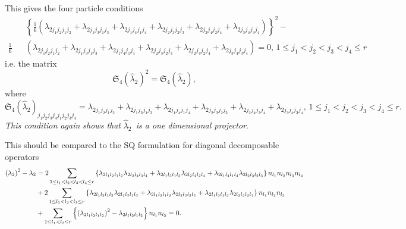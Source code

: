 \documentclass[12pt]{article}
\begin{document}
This gives the four particle conditions%
\begin{eqnarray*}
&&\left\{ \frac{1}{6}\left( \lambda _{2j_{1}j_{2}j_{1}j_{2}}+\lambda
_{2j_{1}j_{3}j_{1}j_{3}}+\lambda _{2j_{1}j_{4}j_{1}j_{4}}+\lambda
_{2j_{2}j_{3}j_{2}j_{3}}+\lambda _{2j_{2}j_{4}j_{2}j_{4}}+\lambda
_{2j_{3}j_{4}j_{3}j_{4}}\right) \right\} ^{2}- \\
\frac{1}{6} &&\left( \lambda _{2j_{1}j_{2}j_{1}j_{2}}+\lambda
_{2j_{1}j_{3}j_{1}j_{3}}+\lambda _{2j_{1}j_{4}j_{1}j_{4}}+\lambda
_{2j_{2}j_{3}j_{2}j_{3}}+\lambda _{2j_{2}j_{4}j_{2}j_{4}}+\lambda
_{2j_{3}j_{4}j_{3}j_{4}}\right) =0,\,1\leq j_{1}<j_{2}<j_{3}<j_{4}\leq r
\end{eqnarray*}%
i.e. the matrix 
\begin{equation*}
\mathfrak{S}_{4}\left( \hat{\lambda}_{2}\right) ^{2}=\mathfrak{S}_{4}\left( 
\hat{\lambda}_{2}\right) ,
\end{equation*}%
where 
\begin{equation*}
\mathfrak{S}_{4}\left( \hat{\lambda}_{2}\right)
_{j_{1}j_{2}j_{3}j_{4}j_{1}j_{2}j_{3}j_{4}}=\lambda
_{2j_{1}j_{2}j_{1}j_{2}}+\lambda _{2j_{1}j_{3}j_{1}j_{3}}+\lambda
_{2j_{1}j_{4}j_{1}j_{4}}+\lambda _{2j_{2}j_{3}j_{2}j_{3}}+\lambda
_{2j_{2}j_{4}j_{2}j_{4}}+\lambda _{2j_{3}j_{4}j_{3}j_{4}},\,1\leq
j_{1}<j_{2}<j_{3}<j_{4}\leq r.
\end{equation*}%
\emph{This condition again shows that }$\hat{\lambda}_{2}$\emph{\ is a one
dimensional projector}.

This should be compared to the SQ formulation for diagonal decomposable
operators 
\begin{align}
\left( \lambda _{2}\right) ^{2}-\lambda _{2}& =2\sum_{\substack{ 1\leq
l_{1}<l_{2}<l_{3}<l_{4}\leq r}}\left\{ \lambda
_{2l_{1}l_{2}l_{1}l_{2}}\lambda _{2l_{3}l_{4}l_{3}l_{4}}+\lambda
_{2l_{1}l_{3}l_{1}l_{3}}\lambda _{2l_{2}l_{4}l_{2}l_{4}}+\lambda
_{2l_{1}l_{4}l_{1}l_{4}}\lambda _{2l_{2}l_{3}l_{2}l_{3}}\right\}
n_{l_{1}}n_{l_{2}}n_{l_{3}}n_{l_{4}}  \notag \\
& +2\sum_{\substack{ 1\leq l_{1}<l_{2}<l_{3}\leq r}}\left\{ \lambda
_{2l_{1}l_{2}l_{1}l_{2}}\lambda _{2l_{1}l_{3}l_{1}l_{3}}+\lambda
_{2l_{1}l_{2}l_{1}l_{2}}\lambda _{2l_{2}l_{3}l_{2}l_{3}}+\lambda
_{2l_{1}l_{3}l_{1}l_{3}}\lambda _{2l_{2}l_{3}l_{2}l_{3}}\right\}
n_{l_{1}}n_{l_{2}}n_{l_{3}}  \notag \\
& +\sum_{\substack{ 1\leq l_{1}<l_{2}\leq r}}\left\{ \left( \lambda
_{2l_{1}l_{2}l_{1}l_{2}}\right) ^{2}-\lambda
_{2l_{1}l_{2}l_{1}l_{2}}\right\} n_{l_{1}}n_{l_{2}}=0.  \notag
\end{align}
\end{document}
